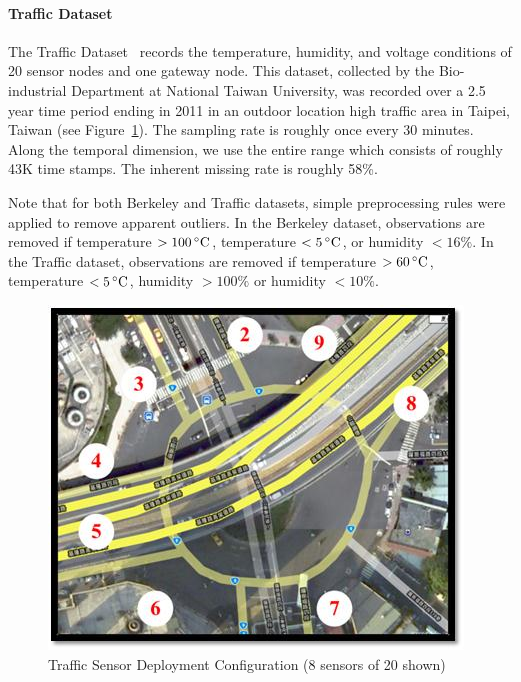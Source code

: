 \vspace{-0.5cm}

\paragraph*{Traffic Dataset}

The Traffic Dataset~\cite{liu2011developed} records the temperature, humidity, and voltage conditions of 20 sensor nodes and one gateway node.
This dataset, collected by the Bio-industrial Department at National Taiwan University, was recorded over a 2.5 year time period ending in 2011 in an outdoor location high traffic area in Taipei, Taiwan (see Figure~\ref{fig:traffic}).
The sampling rate is roughly once every 30 minutes.
Along the temporal dimension, we use the entire range which consists of roughly 43K time stamps.
The inherent missing rate is roughly 58\%.

Note that for both Berkeley and Traffic datasets, simple preprocessing rules were applied to remove apparent outliers.
In the Berkeley dataset, observations are removed if temperature \mbox{$>100\,^{\circ}\mathrm{C}$}, temperature \mbox{$<5\,^{\circ}\mathrm{C}$}, or humidity \mbox{$<16\%$}.
In the Traffic dataset, observations are removed if temperature \mbox{$>60\,^{\circ}\mathrm{C}$}, temperature \mbox{$<5\,^{\circ}\mathrm{C}$}, humidity \mbox{$>100\%$} or humidity \mbox{$<10\%$}.
\begin{figure}[H]
\centering
\includegraphics[scale=0.3]{traffic_wsn.png}
\caption{Traffic Sensor Deployment Configuration (8 sensors of 20 shown)}
\label{fig:traffic}
\end{figure}


